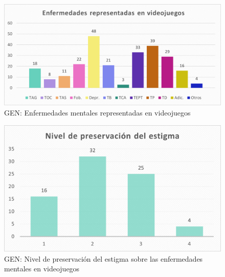 \documentclass[12pt, a4paper,twoside,titlepage]{book}
\begin{document}
\begin{figure}
    \centering
    \includegraphics[width=.8\linewidth]{ANEXO Gen/15AnexGENEnfvid}
    \caption{GEN: Enfermedades mentales representadas en videojuegos}
    \label{fig:GENEnfvid}
\end{figure}


\begin{figure}
    \centering
    \includegraphics[width=.8\linewidth]{ANEXO Gen/16AnexGENEst}
    \caption{GEN: Nivel de preservación del estigma sobre las enfermedades mentales en videojuegos}
    \label{fig:GENEstigma}
\end{figure}
\end{document}
